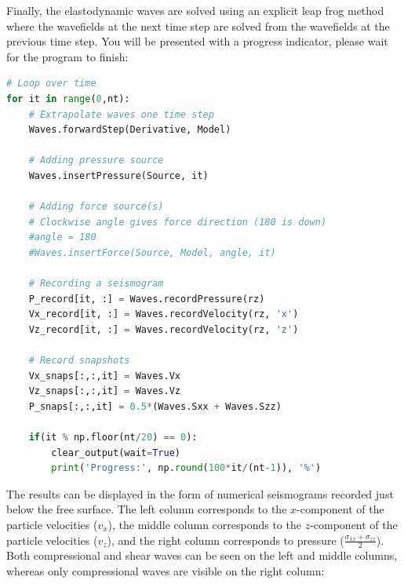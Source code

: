 \documentclass[a4paper , 12pt]{book}
\begin{document}
Finally, the elastodynamic waves are solved using an explicit leap frog method where the wavefields at the next time step are solved from the wavefields at the previous time step. You will be presented with a progress indicator, please wait for the program to finish:

\begin{center}
\begin{lstlisting}[language=Python, frame=single]
# Loop over time
for it in range(0,nt):
    # Extrapolate waves one time step
    Waves.forwardStep(Derivative, Model)
    
    # Adding pressure source 
    Waves.insertPressure(Source, it)

    # Adding force source(s)
    # Clockwise angle gives force direction (180 is down)
    #angle = 180 
    #Waves.insertForce(Source, Model, angle, it)    
    
    # Recording a seismogram 
    P_record[it, :] = Waves.recordPressure(rz)
    Vx_record[it, :] = Waves.recordVelocity(rz, 'x')
    Vz_record[it, :] = Waves.recordVelocity(rz, 'z')
    
    # Record snapshots
    Vx_snaps[:,:,it] = Waves.Vx 
    Vz_snaps[:,:,it] = Waves.Vz 
    P_snaps[:,:,it] = 0.5*(Waves.Sxx + Waves.Szz) 
            
    if(it % np.floor(nt/20) == 0):
        clear_output(wait=True)
        print('Progress:', np.round(100*it/(nt-1)), '%')
\end{lstlisting}
\end{center}

The results can be displayed in the form of numerical seismograms recorded just below the free surface. The left column corresponds to the $x$-component of the particle velocities ($v_x$), the middle column corresponds to the $z$-component of the particle velocities ($v_z$), and the right column corresponds to pressure ($\frac{\sigma_{xx} + \sigma_{zz}}{2}$). Both compressional and shear waves can be seen on the left and middle columns, whereas only compressional waves are visible on the right column: \\
\end{document}
